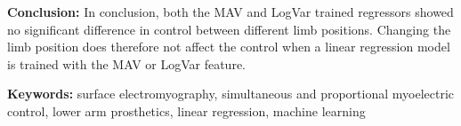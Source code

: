 \textbf{Conclusion:} 
In conclusion, both the MAV and LogVar trained regressors showed no significant difference in control between different limb positions. Changing the limb position does therefore not affect the control when a linear regression model is trained with the MAV or LogVar feature. 

\textbf{Keywords:} surface electromyography, simultaneous and proportional myoelectric control, lower arm prosthetics, linear regression, machine learning %

